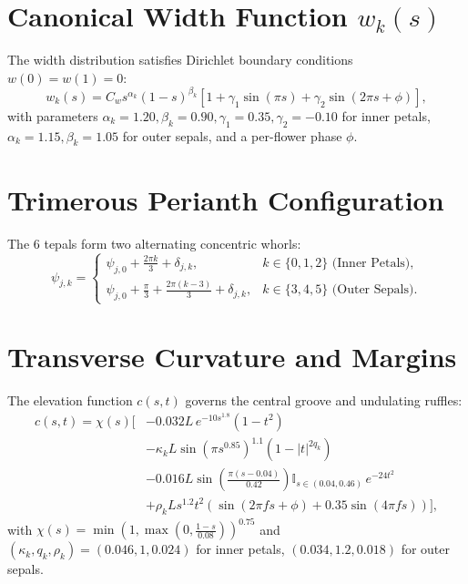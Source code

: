 \documentclass[10pt,twocolumn]{article}
\begin{document}
\section{Canonical Width Function $w_k(s)$}
The width distribution satisfies Dirichlet boundary conditions $w(0) = w(1) = 0$:
\begin{equation}
w_k(s) = C_w s^{\alpha_k} (1 - s)^{\beta_k} \left[ 1 + \gamma_1 \sin(\pi s) + \gamma_2 \sin(2\pi s + \phi) \right],
\end{equation}
with parameters $\alpha_k = 1.20, \beta_k = 0.90, \gamma_1 = 0.35, \gamma_2 = -0.10$ for inner petals, $\alpha_k = 1.15, \beta_k = 1.05$ for outer sepals, and a per-flower phase $\phi$.

\section{Trimerous Perianth Configuration}
The 6 tepals form two alternating concentric whorls:
\begin{equation}
\psi_{j,k} = \begin{cases}
\psi_{j,0} + \frac{2\pi k}{3} + \delta_{j,k}, & k \in \{0, 1, 2\} \text{ (Inner Petals)}, \\
\psi_{j,0} + \frac{\pi}{3} + \frac{2\pi(k-3)}{3} + \delta_{j,k}, & k \in \{3, 4, 5\} \text{ (Outer Sepals)}.
\end{cases}
\end{equation}

\section{Transverse Curvature and Margins}
The elevation function $c(s, t)$ governs the central groove and undulating ruffles:
\begin{equation}
\begin{aligned}
c(s, t) = \chi(s)\Big[ &-0.032 L\, e^{-10 s^{1.8}}(1 - t^2) \\
&- \kappa_k L \sin(\pi s^{0.85})^{1.1}\left(1 - |t|^{2 q_k}\right) \\
&- 0.016 L \sin\!\left(\tfrac{\pi(s - 0.04)}{0.42}\right)\mathbb{I}_{s \in (0.04, 0.46)}\, e^{-24 t^2} \\
&+ \rho_k L s^{1.2} t^2\left(\sin(2\pi f s + \phi) + 0.35\sin(4\pi f s)\right)\Big],
\end{aligned}
\end{equation}
with $\chi(s) = \min\!\left(1, \max\!\left(0, \frac{1 - s}{0.08}\right)\right)^{0.75}$ and
$(\kappa_k, q_k, \rho_k) = (0.046, 1, 0.024)$ for inner petals, $(0.034, 1.2, 0.018)$ for outer sepals.
\end{document}
